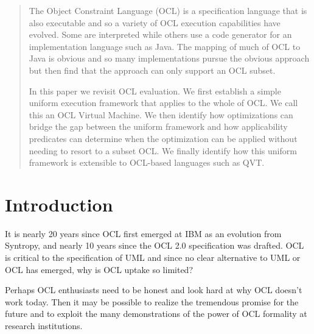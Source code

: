 \documentclass{sig-alternate}
\begin{document}
\maketitle
\begin{abstract}
The Object Constraint Language (OCL) is a specification language that is also executable
and so a variety of OCL execution capabilities have evolved. Some are interpreted while
others use a code generator for an implementation language such as Java. The mapping
of much of OCL to Java is obvious and so many implementations pursue the obvious approach
but then find that the approach can only support an OCL subset.

In this paper we revisit OCL evaluation. We first establish a simple uniform execution framework
that applies to the whole of OCL. We call this an OCL Virtual Machine.
We then identify how optimizations can bridge the gap between
the uniform framework and how applicability predicates can determine when the optimization can
be applied without needing to resort to a subset OCL. We finally identify how this uniform
framework is extensible to OCL-based languages such as QVT.
\end{abstract}




\section{Introduction}
It is nearly 20 years since OCL first emerged at IBM as an evolution from Syntropy, and nearly 10 years since the OCL 2.0 specification was drafted\cite{OCL-2.0-draft}. OCL is critical to the specification of UML and since no clear alternative to UML or OCL has emerged, why is OCL uptake so limited?

Perhaps OCL enthusiasts need to be honest and look hard at why OCL doesn't work today.
Then it may be possible to realize the tremendous promise for the future and to exploit the many
demonstrations of the power of OCL formality at research institutions.
\end{document}
